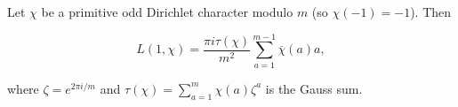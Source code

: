Let $\chi$ be a primitive odd Dirichlet character modulo $m$ (so $\chi(-1) = -1$). Then

$$L(1, \chi) = \frac{\pi i \tau(\chi)}{m^2} \sum_{a=1}^{m-1} \overline{\chi}(a) a,$$

where $\zeta = e^{2\pi i / m}$ and $\tau(\chi) = \sum_{a=1}^{m} \chi(a) \zeta^a$ is the Gauss sum.
